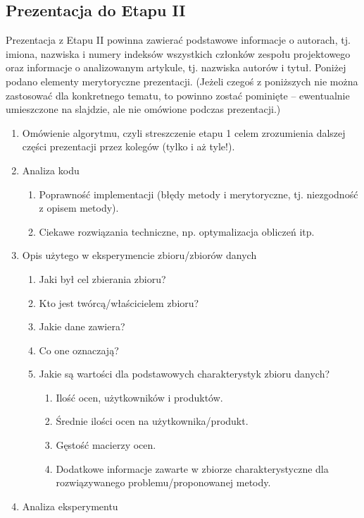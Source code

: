 \documentclass[a4paper]{LTJournalArticle}
\begin{document}
	\subsection{Prezentacja do Etapu II}
	Prezentacja z Etapu II powinna zawierać podstawowe informacje
	o autorach, tj. imiona, nazwiska i numery indeksów wszystkich członków
	zespołu projektowego oraz informacje o analizowanym artykule, tj. nazwiska
	autorów i tytuł. 
	Poniżej podano elementy merytoryczne prezentacji. (Jeżeli czegoś z poniższych
	nie można zastosować dla konkretnego tematu, to powinno zostać pominięte – 
	ewentualnie umieszczone na slajdzie, ale nie omówione podczas prezentacji.)
	\begin{enumerate}
		\item Omówienie algorytmu, czyli streszczenie etapu 1 celem zrozumienia
		dalszej części prezentacji przez kolegów (tylko i aż tyle!).
		\item Analiza kodu
		\begin{enumerate}
			\item Poprawność implementacji (błędy metody i merytoryczne, tj.
			niezgodność z opisem metody).
			\item Ciekawe rozwiązania techniczne, np. optymalizacja obliczeń itp.
		\end{enumerate}
		\item Opis użytego w eksperymencie zbioru/zbiorów danych
		\begin{enumerate}
			\item Jaki był cel zbierania zbioru?
			\item Kto jest twórcą/właścicielem zbioru?
			\item Jakie dane zawiera?
			\item Co one oznaczają?
			\item Jakie są wartości dla podstawowych charakterystyk zbioru danych?
			\begin{enumerate}
				\item Ilość ocen, użytkowników i produktów.
				\item Średnie ilości ocen na użytkownika/produkt.
				\item Gęstość macierzy ocen.
				\item Dodatkowe informacje zawarte w zbiorze charakterystyczne dla
				rozwiązywanego problemu/proponowanej metody.
			\end{enumerate}
		\end{enumerate}
		\item Analiza eksperymentu
		\begin{enumerate}

\end{enumerate}
\end{enumerate}
\end{document}

